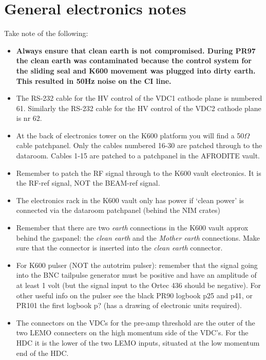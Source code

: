 \documentclass[11pt]{report}
\begin{document}
\section{General electronics notes}\label{section:electronics}

Take note of the following:
\begin{itemize}

\item {\bf Always ensure that clean earth is not compromised. During PR97 
the clean earth was contaminated because the control system for the sliding seal and K600 movement was 
plugged into dirty earth. This resulted in 50Hz noise on the CI line.}

\item The RS-232 cable for the HV control of the VDC1 cathode plane
is numbered 61. Similarly the RS-232 cable for the HV control of the 
VDC2 cathode plane is nr 62.

\item At the back of electronics tower on the K600 platform you will
find a 50$\Omega$ cable patchpanel. Only the cables numbered 16-30 are
patched through to the dataroom. Cables 1-15 are patched to a patchpanel
in the AFRODITE vault.

\item Remember to patch the RF signal through to the K600 vault electronics.
It is the RF-ref signal, NOT the BEAM-ref signal.

\item The electronics rack in the K600 vault only has power if `clean 
power' is connected via the dataroom patchpanel (behind the NIM crates)

\item Remember that there are two {\it earth} connections in the K600 vault approx
behind the gaspanel: the {\it  clean earth} and the {\it Mother earth} connections.
Make sure that the connector is inserted into the {\it  clean earth} connector.

\item For K600 pulser (NOT the autotrim pulser): remember that the signal going 
into the BNC tailpulse generator must be positive and have an amplitude of at least 1 volt
(but the signal input to the Ortec 436 should be negative).
For other useful info on the pulser see the black PR90 logbook p25 and p41, or PR101 
the first logbook p? (has a drawing of electronic units required).

\item The connectors on the VDCs for the pre-amp threshold are the outer of the
two LEMO connecters on the high momentum side of the VDC's.
For the HDC it is the lower of the two LEMO inputs, situated at the low momentum
end of the HDC.


\end{itemize}
\end{document}
